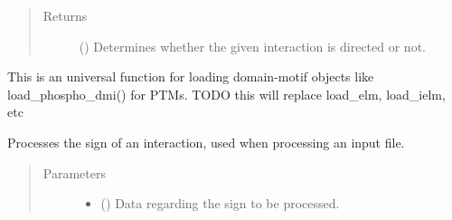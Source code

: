 \documentclass[letterpaper,10pt,english]{sphinxmanual}
\begin{document}
\begin{fulllineitems}
\begin{fulllineitems}
\begin{quote}
\begin{description}
\begin{itemize}
\end{itemize}

\item[{Returns}] \leavevmode
() \textendash{} Determines whether the given interaction is
directed or not.

\end{description}\end{quote}

\end{fulllineitems}


\begin{fulllineitems}
\label{\detokenize{reference:pypath.main.PyPath.process_directions}}
\end{fulllineitems}


\begin{fulllineitems}
\label{\detokenize{reference:pypath.main.PyPath.process_dmi}}
This is an universal function
for loading domain-motif objects
like load\_phospho\_dmi() for PTMs.
TODO this will replace load\_elm, load\_ielm, etc

\end{fulllineitems}


\begin{fulllineitems}
\label{\detokenize{reference:pypath.main.PyPath.process_sign}}
Processes the sign of an interaction, used when processing an
input file.
\begin{quote}\begin{description}
\item[{Parameters}] \leavevmode\begin{itemize}
\item {} 
 () \textendash{} Data regarding the sign to be processed.


\end{itemize}
\end{description}
\end{quote}
\end{fulllineitems}
\end{fulllineitems}
\end{document}
